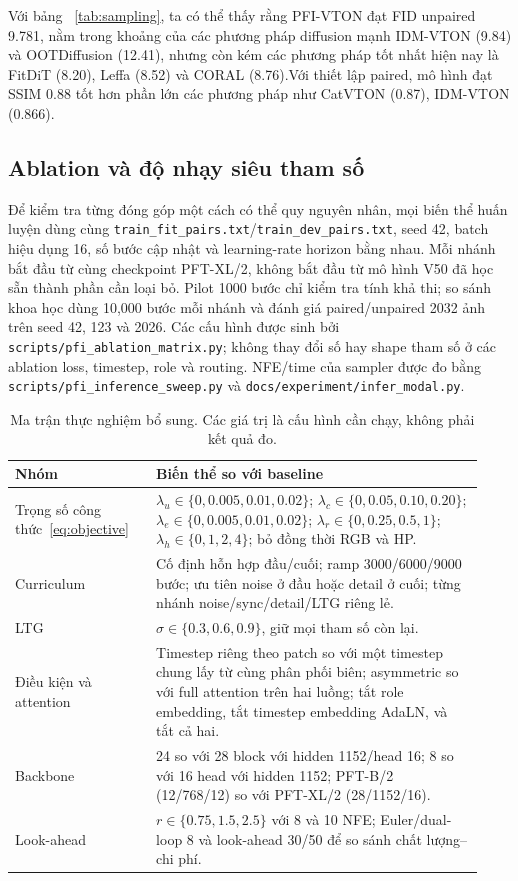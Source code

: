 \documentclass[11pt,a4paper]{article}
\begin{document}
Với bảng ~\ref{tab:sampling}, ta có thể thấy rằng PFI-VTON đạt FID unpaired 9.781, nằm trong khoảng của các phương pháp diffusion mạnh IDM-VTON (9.84) và OOTDiffusion (12.41), nhưng còn kém các phương pháp tốt nhất hiện nay là FitDiT (8.20), Leffa (8.52) và CORAL (8.76).Với thiết lập paired, mô hình đạt SSIM 0.88 tốt hơn phần lớn các phương pháp như CatVTON (0.87), IDM-VTON (0.866).

\subsection{Ablation và độ nhạy siêu tham số}

Để kiểm tra từng đóng góp một cách có thể quy nguyên nhân, mọi biến thể huấn luyện dùng cùng \texttt{train\_fit\_pairs.txt}/\texttt{train\_dev\_pairs.txt}, seed 42, batch hiệu dụng 16, số bước cập nhật và learning-rate horizon bằng nhau. Mỗi nhánh bắt đầu từ cùng checkpoint PFT-XL/2, không bắt đầu từ mô hình V50 đã học sẵn thành phần cần loại bỏ. Pilot 1000 bước chỉ kiểm tra tính khả thi; so sánh khoa học dùng 10{,}000 bước mỗi nhánh và đánh giá paired/unpaired 2032 ảnh trên seed 42, 123 và 2026. Các cấu hình được sinh bởi \texttt{scripts/pfi\_ablation\_matrix.py}; không thay đổi số hay shape tham số ở các ablation loss, timestep, role và routing. NFE/time của sampler được đo bằng \texttt{scripts/pfi\_inference\_sweep.py} và \texttt{docs/experiment/infer\_modal.py}.

\begin{table}[!t]
\centering\small
\caption{Ma trận thực nghiệm bổ sung. Các giá trị là cấu hình cần chạy, không phải kết quả đo.}
\label{tab:ablation_protocol}
\begin{tabular}{p{0.28\linewidth}p{0.65\linewidth}}
\toprule
Nhóm & Biến thể so với baseline \\
\midrule
Trọng số công thức~\eqref{eq:objective} & \(\lambda_u\in\{0,0.005,0.01,0.02\}\); \(\lambda_c\in\{0,0.05,0.10,0.20\}\); \(\lambda_e\in\{0,0.005,0.01,0.02\}\); \(\lambda_r\in\{0,0.25,0.5,1\}\); \(\lambda_h\in\{0,1,2,4\}\); bỏ đồng thời RGB và HP. \\
Curriculum & Cố định hỗn hợp đầu/cuối; ramp 3000/6000/9000 bước; ưu tiên noise ở đầu hoặc detail ở cuối; từng nhánh noise/sync/detail/LTG riêng lẻ. \\
LTG & \(\sigma\in\{0.3,0.6,0.9\}\), giữ mọi tham số còn lại. \\
Điều kiện và attention & Timestep riêng theo patch so với một timestep chung lấy từ cùng phân phối biên; asymmetric so với full attention trên hai luồng; tắt role embedding, tắt timestep embedding AdaLN, và tắt cả hai. \\
Backbone & 24 so với 28 block với hidden 1152/head 16; 8 so với 16 head với hidden 1152; PFT-B/2 (12/768/12) so với PFT-XL/2 (28/1152/16). \\
Look-ahead & \(r\in\{0.75,1.5,2.5\}\) với 8 và 10 NFE; Euler/dual-loop 8 và look-ahead 30/50 để so sánh chất lượng--chi phí. \\
\bottomrule
\end{tabular}
\end{table}
\end{document}
